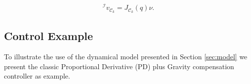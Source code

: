 \begin{align*} 
^\mathcal{I}v_{\mathcal{C}_k} = {J}_{\mathcal{C}_k}(q) {\nu}.
\end{align*}




\subsection{Control Example} %
\label{sub:control_examples}

To illustrate the use of the dynamical model presented in Section \ref{sec:model} we present the classic Proportional Derivative (PD) plus Gravity compensation controller as example.

